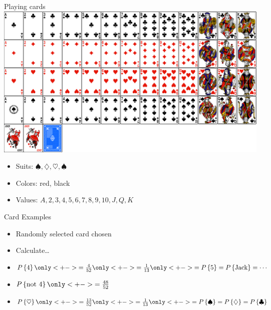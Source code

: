 \documentclass[handout]{beamer}
\theoremstyle{definition}
\begin{document}
\begin{frame}{Playing cards}
\includegraphics[scale=.15]{cards}
\begin{itemize}
\item Suits: $\spadesuit,\diamondsuit,\heartsuit,\spadesuit$
\item Colors: red, black
\item Values: $A,2,3,4,5,6,7,8,9,10,J,Q,K$
\end{itemize}
\end{frame}

\begin{frame}{Card Examples}
\begin{itemize}
\item Randomly selected card chosen
\item Calculate\dots
\item $P\left\{4\right\}\only<+->{=\frac{4}{52}}
\only<+->{=\frac{1}{13}}
\only<+->{=P\left\{5\right\}=P\left\{\text{Jack}\right\}=\cdots}$
\item $P\left\{\text{not $4$}\right\}\only<+->{=\frac{48}{52}}$
\item $P\left\{\heartsuit\right\}
\only<+->{=\frac{13}{52}}\only<+->{=\frac{1}{13}}
\only<+->{=P\left\{\spadesuit\right\}
=P\left\{\diamondsuit\right\}
=P\left\{\clubsuit\right\}}$

\end{itemize}
\end{frame}
\end{document}
